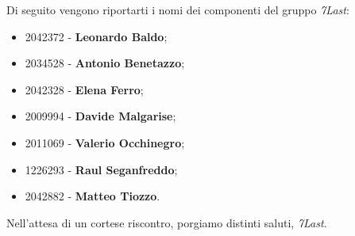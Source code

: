 \documentclass[italian,12pt]{article} %
\begin{document}
\newpage
\begin{flushleft}
    Di seguito vengono riportarti i nomi dei componenti del gruppo \textit{7Last}:
    \begin{itemize}
        \item 2042372 - \textbf{Leonardo Baldo};
        \item 2034528 - \textbf{Antonio Benetazzo};
        \item 2042328 - \textbf{Elena Ferro};
        \item 2009994 - \textbf{Davide Malgarise};
        \item 2011069 - \textbf{Valerio Occhinegro};
        \item 1226293 - \textbf{Raul Seganfreddo};
        \item 2042882 - \textbf{Matteo Tiozzo}.
    \end{itemize}
    Nell'attesa di un cortese riscontro, porgiamo distinti saluti, \textit{7Last}.
\end{flushleft}
\end{document}
